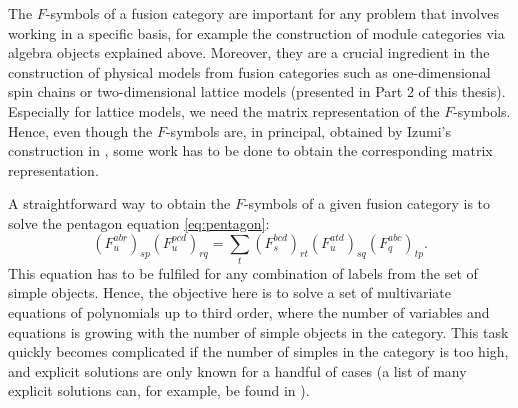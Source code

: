{{{	The $F$-symbols of a fusion category are important for any problem that involves working in a specific basis, for example the construction of module categories via algebra objects explained above. Moreover, they are a crucial ingredient in the construction of physical models from fusion categories such as one-dimensional spin chains or two-dimensional lattice models (presented in Part $2$ of this thesis). Especially for lattice models, we need the matrix representation of the $F$-symbols. Hence, even though the $F$-symbols are, in principal, obtained by Izumi's construction in \cite{izumi_structure_2001}, some work has to be done to obtain the corresponding matrix representation.
	
	A straightforward way to obtain the $F$-symbols of a given fusion category is to solve the pentagon equation \eqref{eq:pentagon}:
			\begin{equation}
			\label{eq:penta2}
				\left(F_u^{abr}\right)_{sp}\left(F_u^{pcd}\right)_{rq}=\sum_t \left(F_s^{bcd}\right)_{rt}\left(F_u^{atd}\right)_{sq}\left(F_q^{abc}\right)_{tp}.
			\end{equation}
	This equation has to be fulfiled for any combination of labels from the set of simple objects. Hence, the objective here is to solve a set of multivariate equations of polynomials up to third order, where the number of variables and equations is growing with the number of simple objects in the category. This task quickly becomes complicated if the number of simples in the category is too high, and explicit solutions are only known for a handful of cases (a list of many explicit solutions can, for example, be found in \cite{Bond2007}).
	
}}}
